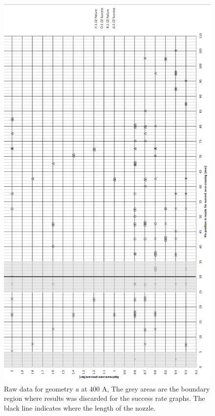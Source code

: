 \documentclass[10pt,a4paper]{article}
\begin{document}
\begin{figure}[H]
\centering
\includegraphics[scale=0.55]{Bilder/Results/rawData400AgeoA.png}
\caption{Raw data for geometry \textit{a} at 400 A, The grey areas are the boundary region where results was discarded for the success rate graphs. The black line indicates where the length of the nozzle.} \label{fig:rawData400AgeoA}
\end{figure}
\newpage
\end{document}
